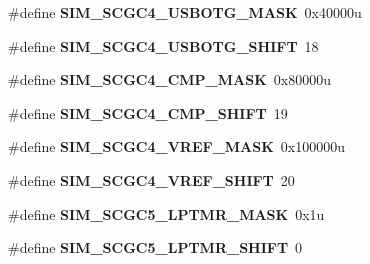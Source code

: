 \begin{DoxyCompactItemize}
\item 
\#define {\bfseries S\+I\+M\+\_\+\+S\+C\+G\+C4\+\_\+\+U\+S\+B\+O\+T\+G\+\_\+\+M\+A\+SK}~0x40000u\hypertarget{group__SIM__Register__Masks_ga136bfa98e3aafded899c9806d5410d4d}{}\label{group__SIM__Register__Masks_ga136bfa98e3aafded899c9806d5410d4d}

\item 
\#define {\bfseries S\+I\+M\+\_\+\+S\+C\+G\+C4\+\_\+\+U\+S\+B\+O\+T\+G\+\_\+\+S\+H\+I\+FT}~18\hypertarget{group__SIM__Register__Masks_ga5d0dd9f68667fdf71fce1b0a6ae990dd}{}\label{group__SIM__Register__Masks_ga5d0dd9f68667fdf71fce1b0a6ae990dd}

\item 
\#define {\bfseries S\+I\+M\+\_\+\+S\+C\+G\+C4\+\_\+\+C\+M\+P\+\_\+\+M\+A\+SK}~0x80000u\hypertarget{group__SIM__Register__Masks_gad7304bdb8fc46deb77c5e444e56fae40}{}\label{group__SIM__Register__Masks_gad7304bdb8fc46deb77c5e444e56fae40}

\item 
\#define {\bfseries S\+I\+M\+\_\+\+S\+C\+G\+C4\+\_\+\+C\+M\+P\+\_\+\+S\+H\+I\+FT}~19\hypertarget{group__SIM__Register__Masks_ga1072a5419bbeaf4081c6c4a5ca7cf86c}{}\label{group__SIM__Register__Masks_ga1072a5419bbeaf4081c6c4a5ca7cf86c}

\item 
\#define {\bfseries S\+I\+M\+\_\+\+S\+C\+G\+C4\+\_\+\+V\+R\+E\+F\+\_\+\+M\+A\+SK}~0x100000u\hypertarget{group__SIM__Register__Masks_gab32de0f8a4b83a05b226638154da75c0}{}\label{group__SIM__Register__Masks_gab32de0f8a4b83a05b226638154da75c0}

\item 
\#define {\bfseries S\+I\+M\+\_\+\+S\+C\+G\+C4\+\_\+\+V\+R\+E\+F\+\_\+\+S\+H\+I\+FT}~20\hypertarget{group__SIM__Register__Masks_ga7f6801c437e23853cffdf9807319ff87}{}\label{group__SIM__Register__Masks_ga7f6801c437e23853cffdf9807319ff87}

\item 
\#define {\bfseries S\+I\+M\+\_\+\+S\+C\+G\+C5\+\_\+\+L\+P\+T\+M\+R\+\_\+\+M\+A\+SK}~0x1u\hypertarget{group__SIM__Register__Masks_ga6f63b73e0ad63163df381c795d583cc1}{}\label{group__SIM__Register__Masks_ga6f63b73e0ad63163df381c795d583cc1}

\item 
\#define {\bfseries S\+I\+M\+\_\+\+S\+C\+G\+C5\+\_\+\+L\+P\+T\+M\+R\+\_\+\+S\+H\+I\+FT}~0\hypertarget{group__SIM__Register__Masks_ga9b3669f3f4f380e18133785d6356c56c}{}\label{group__SIM__Register__Masks_ga9b3669f3f4f380e18133785d6356c56c}


\end{DoxyCompactItemize}
